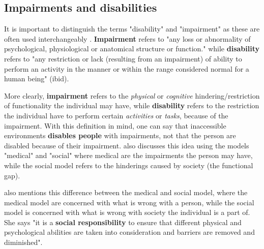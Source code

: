 \fi

\subsection{Impairments and disabilities}
It is important to distinguish the terms "disability" and "impairment" as these are often used interchangeably \parencite{sheena_l._carter_impairment_????}. \textbf{Impairment} refers to "any loss or abnormality of psychological, physiological or anatomical structure or function." while \textbf{disability} refers to "any restriction or lack (resulting from an impairment) of ability to perform an activity in the manner or within the range considered normal for a human being" (ibid). 

More clearly, \textbf{impairment} refers to the \textit{physical} or \textit{cognitive} hindering/restriction of functionality the individual may have, while \textbf{disability} refers to the restriction the individual have to perform certain \textit{activities} or \textit{tasks}, because of the impairment. With this definition in mind, one can say that inaccessible environments \textbf{disables people} with impairments, not that the person are disabled because of their impairment. \textcite{world_health_organization_world_2011} also discusses this idea using the models "medical" and "social" where medical are the impairments the person may have, while the social model refers to the hinderings caused by society (the functional gap).


\textcite{begnum_universal_2017} also mentions this difference between the medical and social model, where the medical model are concerned with what is wrong with a person, while the social model is concerned with what is wrong with society the individual is a part of. She says "it is a \textbf{social responsibility} to ensure that different physical and psychological abilities are taken into consideration and barriers are removed and diminished". 




